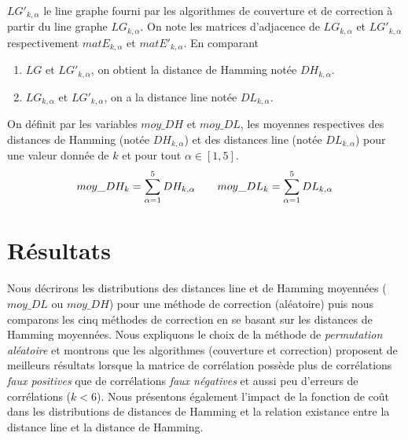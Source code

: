 \documentclass[onecolumn, 12pt]{book}
\begin{document}
 $LG'_{k, \alpha}$  le line graphe fourni par les algorithmes de couverture et de correction \`a partir du line graphe $LG_{k, \alpha}$.
 \newline
 On note les matrices d'adjacence de $LG_{k, \alpha}$ et $LG'_{k, \alpha}$ respectivement $matE_{k, \alpha}$ et $matE'_{k, \alpha}$.
\newline
En comparant
\begin{enumerate}
\item  $LG$ et $LG'_{k, \alpha}$, on obtient la distance de Hamming not\'ee $DH_{k,\alpha}$.
\item $LG_{k,\alpha}$ et $LG'_{k,\alpha}$, on a la distance line not\'ee $DL_{k,\alpha}$.
\end{enumerate}
On d\'efinit par les variables $moy\_DH$ et $moy\_DL$, les moyennes respectives des distances de Hamming (not\'ee $DH_{k,\alpha}$) et des distances line (not\'ee $DL_{k,\alpha}$) pour une valeur donn\'ee de $k$ et pour tout $\alpha \in [1, 5]$.
\begin{equation}
moy\_DH_k = \sum_{\alpha = 1}^{5} DH_{k, \alpha} \hspace{2 em}
moy\_DL_k = \sum_{\alpha = 1}^{5} DL_{k, \alpha}
\end{equation}

  
\section{R\'esultats}
Nous d\'ecrirons les distributions des distances line et de Hamming moyenn\'ees ($moy\_DL$ ou $moy\_DH$) pour une m\'ethode de correction (al\'eatoire) puis nous comparons les cinq m\'ethodes de correction en se basant sur les distances de Hamming moyenn\'ees. 
Nous expliquons le choix de la m\'ethode de {\em permutation al\'eatoire} et montrons que les algorithmes (couverture et correction) proposent de meilleurs r\'esultats lorsque la matrice de corr\'elation poss\`ede plus de corr\'elations {\em faux positives} que de corr\'elations {\em faux n\'egatives} et aussi peu d'erreurs de corr\'elations ($k < 6$). 
\newline
Nous pr\'esentons \'egalement l'impact de la fonction de co\^ut dans les distributions  de distances de Hamming et 
la relation existance entre la distance line et la distance de Hamming.
\end{document}
